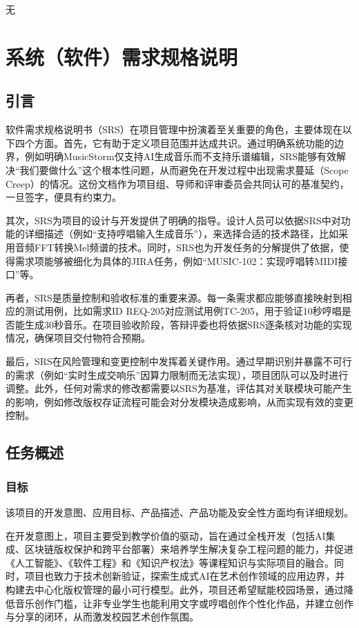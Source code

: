 \documentclass{base}
\numberwithin{figure}{section} %
\begin{document}
无
\newpage

\section{系统（软件）需求规格说明}

\subsection{引言}

软件需求规格说明书（SRS）在项目管理中扮演着至关重要的角色，主要体现在以下四个方面。首先，它有助于定义项目范围并达成共识。通过明确系统功能的边界，例如明确MusicStorm仅支持AI生成音乐而不支持乐谱编辑，SRS能够有效解决“我们要做什么”这个根本性问题，从而避免在开发过程中出现需求蔓延（Scope Creep）的情况。这份文档作为项目组、导师和评审委员会共同认可的基准契约，一旦签字，便具有约束力。

其次，SRS为项目的设计与开发提供了明确的指导。设计人员可以依据SRS中对功能的详细描述（例如“支持哼唱输入生成音乐”），来选择合适的技术路径，比如采用音频FFT转换Mel频谱的技术。同时，SRS也为开发任务的分解提供了依据，使得需求项能够被细化为具体的JIRA任务，例如“MUSIC-102：实现哼唱转MIDI接口”等。

再者，SRS是质量控制和验收标准的重要来源。每一条需求都应能够直接映射到相应的测试用例，比如需求ID REQ-205对应测试用例TC-205，用于验证10秒哼唱是否能生成30秒音乐。在项目验收阶段，答辩评委也将依据SRS逐条核对功能的实现情况，确保项目交付物符合预期。

最后，SRS在风险管理和变更控制中发挥着关键作用。通过早期识别并暴露不可行的需求（例如“实时生成交响乐”因算力限制而无法实现），项目团队可以及时进行调整。此外，任何对需求的修改都需要以SRS为基准，评估其对关联模块可能产生的影响，例如修改版权存证流程可能会对分发模块造成影响，从而实现有效的变更控制。

\subsection{任务概述}
\subsubsection{目标}

该项目的开发意图、应用目标、产品描述、产品功能及安全性方面均有详细规划。

在开发意图上，项目主要受到教学价值的驱动，旨在通过全栈开发（包括AI集成、区块链版权保护和跨平台部署）来培养学生解决复杂工程问题的能力，并促进《人工智能》、《软件工程》和《知识产权法》等课程知识与实际项目的融合。同时，项目也致力于技术创新验证，探索生成式AI在艺术创作领域的应用边界，并构建去中心化版权管理的最小可行模型。此外，项目还希望赋能校园场景，通过降低音乐创作门槛，让非专业学生也能利用文字或哼唱创作个性化作品，并建立创作与分享的闭环，从而激发校园艺术创作氛围。
\end{document}

